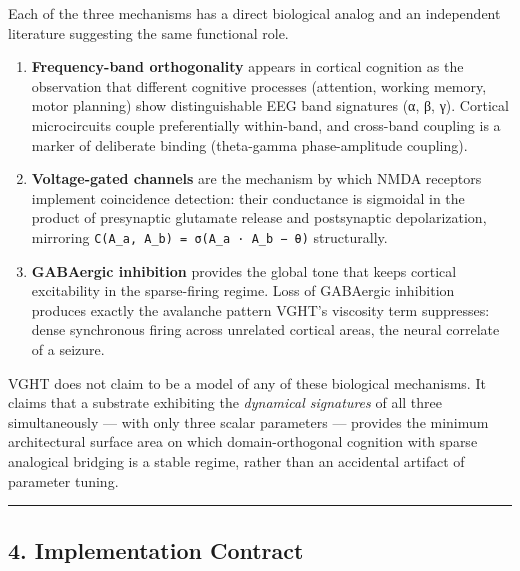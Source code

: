 \documentclass[
  11pt,
  a4paper,
]{article}
\providecommand{\tightlist}{%
  \setlength{\itemsep}{0pt}\setlength{\parskip}{0pt}}
\begin{document}
Each of the three mechanisms has a direct biological analog and an
independent literature suggesting the same functional role.

\begin{enumerate}
\def\labelenumi{\arabic{enumi}.}
\tightlist
\item
  \textbf{Frequency-band orthogonality} appears in cortical cognition as
  the observation that different cognitive processes (attention, working
  memory, motor planning) show distinguishable EEG band signatures (α,
  β, γ). Cortical microcircuits couple preferentially within-band, and
  cross-band coupling is a marker of deliberate binding (theta-gamma
  phase-amplitude coupling).
\item
  \textbf{Voltage-gated channels} are the mechanism by which NMDA
  receptors implement coincidence detection: their conductance is
  sigmoidal in the product of presynaptic glutamate release and
  postsynaptic depolarization, mirroring
  \texttt{C(A\_a,\ A\_b)\ =\ σ(A\_a\ ·\ A\_b\ −\ θ)} structurally.
\item
  \textbf{GABAergic inhibition} provides the global tone that keeps
  cortical excitability in the sparse-firing regime. Loss of GABAergic
  inhibition produces exactly the avalanche pattern VGHT's viscosity
  term suppresses: dense synchronous firing across unrelated cortical
  areas, the neural correlate of a seizure.
\end{enumerate}

VGHT does not claim to be a model of any of these biological mechanisms.
It claims that a substrate exhibiting the \emph{dynamical signatures} of
all three simultaneously --- with only three scalar parameters ---
provides the minimum architectural surface area on which
domain-orthogonal cognition with sparse analogical bridging is a stable
regime, rather than an accidental artifact of parameter tuning.

\begin{center}\rule{0.5\linewidth}{0.5pt}\end{center}

\subsection{4. Implementation Contract}\label{implementation-contract}
\end{document}
